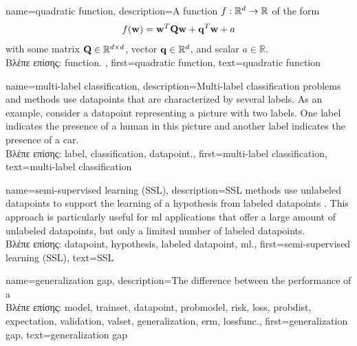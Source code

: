 {name={quadratic function},
	description={A \gls{function} $f: \mathbb{R}^{d} \rightarrow \mathbb{R}$ of the form 
		$$f({\bf w}) =  {\bf w}^{T} \mathbf{Q} \mathbf{w} + \mathbf{q}^{T} {\bf w}+a$$ with 
		some matrix $\mathbf{Q} \in \mathbb{R}^{d \times d}$, vector ${\bf q} \in \mathbb{R}^{d}$, 
		and scalar $a \in \mathbb{R}$. \\
		\foreignlanguage{greek}{Βλέπε επίσης:} \gls{function}. },
	first={quadratic function},
	text={quadratic function}  
}

{name={multi-label classification}, 
	description={Multi-\gls{label} 
		\gls{classification} problems and methods use \gls{datapoint}s 
		that are characterized by several \gls{label}s. As an example, consider a \gls{datapoint} 
		representing a picture with two \gls{label}s. One \gls{label} indicates the presence of a human 
		in this picture and another \gls{label} indicates the presence of a car.\\
		\foreignlanguage{greek}{Βλέπε επίσης:} \gls{label}, \gls{classification}, \gls{datapoint}.},
	  first={multi-label classification},
	  text={multi-label classification} 
}

{name={semi-supervised learning (SSL)}, 
	description={SSL methods use unlabeled \gls{datapoint}s
		to support the learning of a \gls{hypothesis} from \gls{labeled datapoint}s \cite{SemiSupervisedBook}. 
		This approach is particularly useful for \gls{ml} applications that offer a large amount of 
		unlabeled \gls{datapoint}s, but only a limited number of \gls{labeled datapoint}s.\\
		\foreignlanguage{greek}{Βλέπε επίσης:} \gls{datapoint}, \gls{hypothesis}, \gls{labeled datapoint}, \gls{ml}.}, 
	first={semi-supervised learning (SSL)},
	text={SSL} 
}

{name={generalization gap}, 
	description={The difference between the performance of a 
		\\
		\foreignlanguage{greek}{Βλέπε επίσης:} \gls{model}, \gls{trainset}, \gls{datapoint}, \gls{probmodel}, 
		\gls{risk}, \gls{loss}, \gls{probdist}, \gls{expectation}, \gls{validation}, \gls{valset}, \gls{generalization}, 
		\gls{erm}, \gls{lossfunc}.}, 
	first={generalization gap}, 
	text={generalization gap}
} 
	
